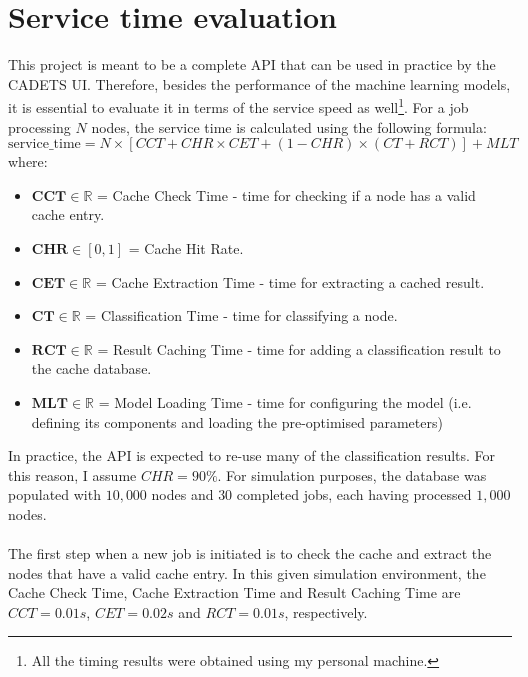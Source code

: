 		\section{Service time evaluation} \label{Section: eval/service-time}
			This project is meant to be a complete API that can be used in practice by the CADETS UI. Therefore, besides the performance of the machine learning models, it is essential to evaluate it in terms of the service speed as well\footnote{All the timing results were obtained using my personal machine.}. For a job processing $N$ nodes, the service time is calculated using the following formula:  
			\begin{equation}
				\text{service\_time} = N\times [CCT + CHR \times CET + (1-CHR) \times (CT + RCT)] + MLT
				\label{Eq: eval/service-time/overall}
			\end{equation}
			where: 
			\begin{itemize}
				\item $\mathbf{CCT} \in \mathbb{R}$ = Cache Check Time - time for checking if a node has a valid cache entry.
				\item $\mathbf{CHR} \in [0, 1]$ = Cache Hit Rate.
				\item $\textbf{CET} \in \mathbb{R}$ = Cache Extraction Time - time for extracting a cached result.
				\item $\textbf{CT} \in \mathbb{R}$ = Classification Time - time for classifying a node. 
				\item $\textbf{RCT} \in \mathbb{R}$ = Result Caching Time - time for adding a classification result to the cache database.
				\item $\mathbf{MLT} \in \mathbb{R}$ = Model Loading Time - time for configuring the model (i.e. defining its components and loading the pre-optimised parameters)
			\end{itemize}
			In practice, the API is expected to re-use many of the classification results. For this reason, I assume $CHR = 90\%$. For simulation purposes, the database was populated with $10, 000$ nodes and $30$ completed jobs, each having processed $1, 000$ nodes. 
			\\ \\
			The first step when a new job is initiated is to check the cache and extract the nodes that have a valid cache entry. In this given simulation environment, the Cache Check Time, Cache Extraction Time and Result Caching Time are $CCT=0.01s$, $CET=0.02s$ and $RCT=0.01s$, respectively.  
			
